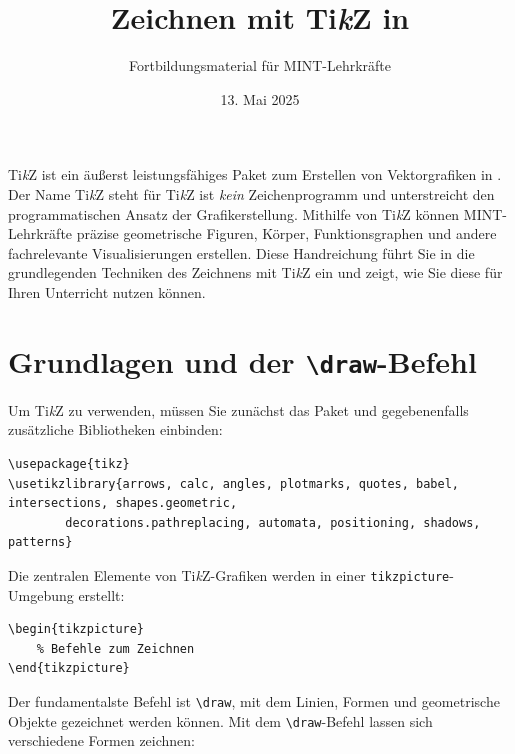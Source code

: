 



\title{Zeichnen mit Ti\textit{k}Z in }
\author{Fortbildungsmaterial für MINT-Lehrkräfte}
\date{13. Mai 2025}
\pagestyle{plain}




\maketitle

Ti\textit{k}Z ist ein äußerst leistungsfähiges Paket zum Erstellen von Vektorgrafiken in . Der Name \glqq{}Ti\textit{k}Z\grqq{} steht für \glqq{}Ti\textit{k}Z ist \textit{kein} Zeichenprogramm\grqq{} und unterstreicht den programmatischen Ansatz der Grafikerstellung. Mithilfe von Ti\textit{k}Z können MINT-Lehrkräfte präzise geometrische Figuren, Körper, Funktionsgraphen und andere fachrelevante Visualisierungen erstellen. Diese Handreichung führt Sie in die grundlegenden Techniken des Zeichnens mit Ti\textit{k}Z ein und zeigt, wie Sie diese für Ihren Unterricht nutzen können.


\section{Grundlagen und der \texttt{\textbackslash draw}-Befehl}

Um Ti\textit{k}Z zu verwenden, müssen Sie zunächst das Paket und gegebenenfalls zusätzliche Bibliotheken einbinden:

\begin{lstlisting}[style=latex]
\usepackage{tikz}
\usetikzlibrary{arrows, calc, angles, plotmarks, quotes, babel,  intersections, shapes.geometric, 
		decorations.pathreplacing, automata, positioning, shadows, patterns}
\end{lstlisting}

Die zentralen Elemente von Ti\textit{k}Z-Grafiken werden in einer \texttt{tikzpicture}-Umgebung erstellt:

\begin{lstlisting}[style=latex]
\begin{tikzpicture}
	% Befehle zum Zeichnen
\end{tikzpicture}
\end{lstlisting}

Der fundamentalste Befehl ist \texttt{\textbackslash draw}, mit dem Linien, Formen und geometrische Objekte gezeichnet werden können. Mit dem \texttt{\textbackslash draw}-Befehl lassen sich verschiedene Formen zeichnen:

